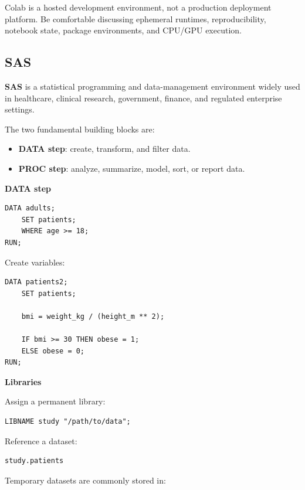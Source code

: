 \documentclass[11pt,letterpaper]{article}
\begin{document}
Colab is a hosted development environment, not a production deployment
platform. Be comfortable discussing ephemeral runtimes, reproducibility,
notebook state, package environments, and CPU/GPU execution.



\subsection{SAS}

\textbf{SAS} is a statistical programming and data-management environment
widely used in healthcare, clinical research, government, finance, and
regulated enterprise settings.

The two fundamental building blocks are:

\begin{itemize}[leftmargin=*]
    \item \textbf{DATA step}: create, transform, and filter data.
    \item \textbf{PROC step}: analyze, summarize, model, sort, or report data.
\end{itemize}

\textbf{DATA step}

\begin{lstlisting}
DATA adults;
    SET patients;
    WHERE age >= 18;
RUN;
\end{lstlisting}

Create variables:

\begin{lstlisting}
DATA patients2;
    SET patients;

    bmi = weight_kg / (height_m ** 2);

    IF bmi >= 30 THEN obese = 1;
    ELSE obese = 0;
RUN;
\end{lstlisting}

\textbf{Libraries}

Assign a permanent library:

\begin{lstlisting}
LIBNAME study "/path/to/data";
\end{lstlisting}

Reference a dataset:

\begin{lstlisting}
study.patients
\end{lstlisting}

Temporary datasets are commonly stored in:
\end{document}
